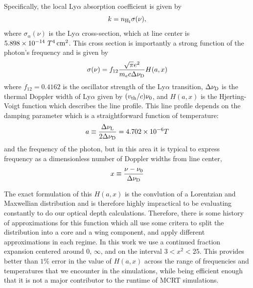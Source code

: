 Specifically, the local Ly$\alpha$ absorption coefficient is given by
\begin{equation}
   \label{eq:kalpaha}
   k = n_{\rm H _I} \sigma(\nu),
\end{equation}
where $\sigma_\alpha(\nu)$ is the Ly$\alpha$ cross-section, which at line center is $5.898\times 10 ^{-14}\ T ^4\,\rm cm^2$.
This cross section is importantly a strong function of the photon's frequency and is given by
\begin{equation}
    \sigma(\nu) = f_{12}\frac{\sqrt{\pi} e^{2}}{m_{e} c \Delta\nu_{\rm{D}}} H(a, x)
\end{equation}
where $f_{12} = 0.4162$ is the oscillator strength of the Ly$\alpha$ transition, $\Delta\nu_{\rm{D}}$ is the thermal Doppler width of Ly$\alpha$ given by $(v_{\rm{th}}/c)\nu_{0}$, and $H(a, x)$ is the Hjerting-Voigt function which describes the line profile.
This line profile depends on the damping parameter which is a straightforward function of temperature:
\begin{equation}
    a \equiv \frac{\Delta \nu_{\rm{L}}}{2\Delta \nu_{\rm{D}}} = 4.702 \times 10^{-6} T
\end{equation}
and the frequency of the photon, but in this area it is typical to express frequency as a dimensionless number of Doppler widths from line center,
\begin{equation}
    x \equiv \frac{\nu - \nu_{0}}{\Delta\nu_{\rm{D}}}
\end{equation}

The exact formulation of this $H(a, x)$ is the convlution of a Lorentzian and Maxwellian distribution and is therefore highly impractical to be evaluating constantly to do our optical depth calculations.
Therefore, there is some history of approximations for this function which all use some critera to split the distribution into a core and a wing component, and apply different approximations in each regime.
In this work we use a continued fraction expansion centered around $0$, $\infty$, and on the interval $3 < x^{2} < 25$.
This provides better than $1\%$ error in the value of $H(a, x)$ across the range of frequencies and temperatures that we encounter in the simulations, while being efficient enough that it is not a major contributor to the runtime of MCRT simulations.

